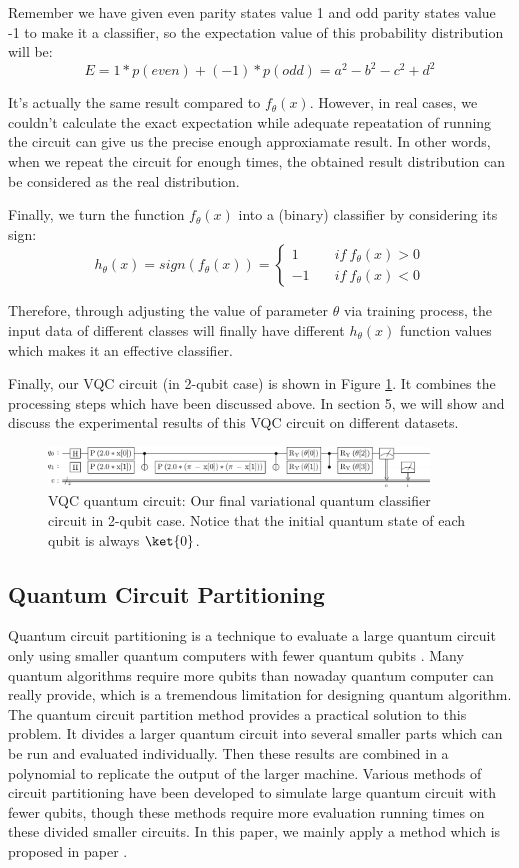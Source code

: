 \documentclass[sigconf]{acmart}
\begin{document}
Remember we have given even parity states value 1 and odd parity states value -1 to make it a classifier, so the expectation value of this probability distribution will be:
$$E=1*p(even)+(-1)*p(odd)=a^2-b^2-c^2+d^2$$

It's actually the same result compared to $f_{\theta}(x)$. However, in real cases, we couldn't calculate the exact expectation while adequate repeatation of running the circuit can give us the precise enough approxiamate result. In other words, when we repeat the circuit for enough times, the obtained result distribution can be considered as the real distribution.

Finally, we turn the function $f_{\theta}(x)$ into a (binary) classifier by considering its sign:
$$
h_{\theta}(x)=sign(f_{\theta}(x))=\left\{
\begin{aligned}
	1  & \quad if \ f_{\theta}(x)>0 \\
	-1  & \quad if \ f_{\theta}(x)<0 
\end{aligned}
\right.
$$

Therefore, through adjusting the value of parameter $\theta$ via training process, the input data of different classes will finally have different $h_{\theta}(x)$ function values which makes it an effective classifier.

Finally, our VQC circuit (in 2-qubit case) is shown in Figure \ref{fig:whole}. It combines the  processing steps which have been discussed above. In section 5, we will show and discuss the experimental results of this VQC circuit on different datasets.
\begin{figure}[!ht]
	\centering
	\includegraphics[width=0.9\textwidth]{whole.png}
	\caption{VQC quantum circuit: {\small \textnormal{Our final variational quantum classifier circuit in 2-qubit case. Notice that the initial quantum state of each qubit is always $\ket{0}$.}} }
	\label{fig:whole}
\end{figure}

\subsection{Quantum Circuit Partitioning}
Quantum circuit partitioning is a technique to evaluate a large quantum circuit only using smaller quantum computers with fewer quantum qubits \cite{marshall2022high}. Many quantum algorithms require more qubits than nowaday quantum computer can really provide, which is a tremendous limitation for designing quantum algorithm. The quantum circuit partition method provides a practical solution to this problem. It divides a larger quantum circuit into several smaller parts which can be run and evaluated individually. Then these results are combined in a polynomial to replicate the output of the larger machine. Various methods of circuit partitioning have been developed to simulate large quantum circuit with fewer qubits, though these methods require more evaluation running times on these divided smaller circuits. In this paper, we mainly apply a method which is proposed in paper \cite{marshall2022high}.
\end{document}
